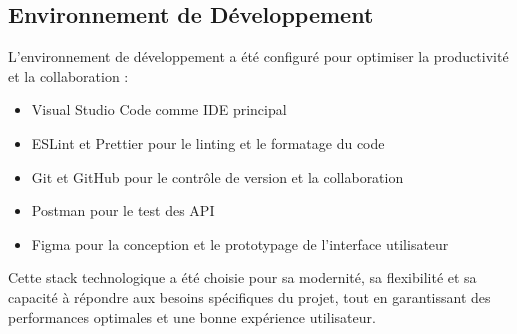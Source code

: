 \subsection{Environnement de Développement}
L'environnement de développement a été configuré pour optimiser la productivité et la collaboration :

\begin{itemize}
  \item Visual Studio Code comme IDE principal
  \item ESLint et Prettier pour le linting et le formatage du code
  \item Git et GitHub pour le contrôle de version et la collaboration
  \item Postman pour le test des API
  \item Figma pour la conception et le prototypage de l'interface utilisateur
\end{itemize}

Cette stack technologique a été choisie pour sa modernité, sa flexibilité et sa capacité à répondre aux besoins spécifiques du projet, tout en garantissant des performances optimales et une bonne expérience utilisateur. 